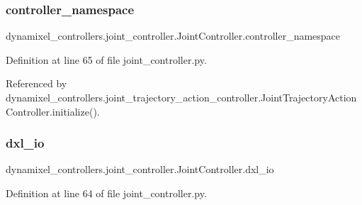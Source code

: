 \subsubsection{\texorpdfstring{controller\+\_\+namespace}{controller\_namespace}}
{\footnotesize\ttfamily dynamixel\+\_\+controllers.\+joint\+\_\+controller.\+Joint\+Controller.\+controller\+\_\+namespace}



Definition at line 65 of file joint\+\_\+controller.\+py.



Referenced by dynamixel\+\_\+controllers.\+joint\+\_\+trajectory\+\_\+action\+\_\+controller.\+Joint\+Trajectory\+Action\+Controller.\+initialize().

\mbox{\label{classdynamixel__controllers_1_1joint__controller_1_1_joint_controller_a8be2fb1ed88aee6590c938122361c780}} 
\subsubsection{\texorpdfstring{dxl\+\_\+io}{dxl\_io}}
{\footnotesize\ttfamily dynamixel\+\_\+controllers.\+joint\+\_\+controller.\+Joint\+Controller.\+dxl\+\_\+io}



Definition at line 64 of file joint\+\_\+controller.\+py.




